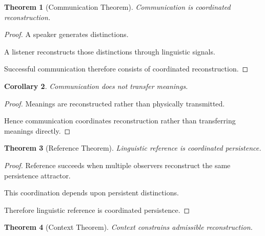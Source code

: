 \documentclass[12pt,oneside]{article}
\newtheorem{theorem}{Theorem}[section] \newtheorem{lemma}[theorem]{Lemma} \newtheorem{proposition}[theorem]{Proposition} \newtheorem{corollary}[theorem]{Corollary}
\theoremstyle{definition}
\begin{document}
\begin{theorem}[Communication Theorem]

Communication is coordinated reconstruction.

\end{theorem}

\begin{proof}

A speaker generates distinctions.

A listener reconstructs those distinctions through linguistic signals.

Successful communication therefore consists of coordinated reconstruction.

\end{proof}

\begin{corollary}

Communication does not transfer meanings.

\end{corollary}

\begin{proof}

Meanings are reconstructed rather than physically transmitted.

Hence communication coordinates reconstruction rather than transferring meanings directly.

\end{proof}

\begin{theorem}[Reference Theorem]

Linguistic reference is coordinated persistence.

\end{theorem}

\begin{proof}

Reference succeeds when multiple observers reconstruct the same persistence attractor.

This coordination depends upon persistent distinctions.

Therefore linguistic reference is coordinated persistence.

\end{proof}

\begin{theorem}[Context Theorem]

Context constrains admissible reconstruction.

\end{theorem}
\end{document}
